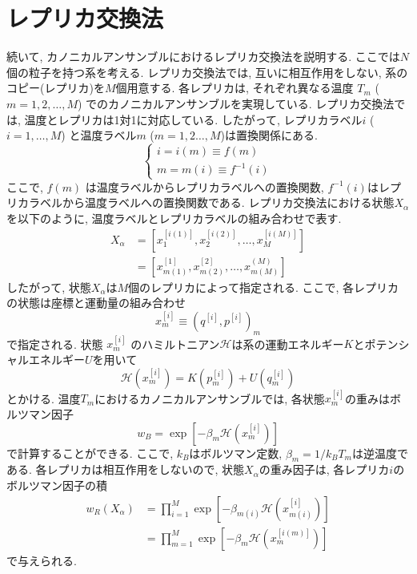 \section{\label{sec:level2-2}レプリカ交換法}
続いて, カノニカルアンサンブルにおけるレプリカ交換法\cite{Sugita1999}を説明する.
ここでは$N$個の粒子を持つ系を考える. レプリカ交換法では, 互いに相互作用をしない, 系のコピー(レプリカ)を$M$個用意する.
各レプリカは, それぞれ異なる温度 $T_m$ ($m=1,2,\dots,M$) でのカノニカルアンサンブルを実現している.
レプリカ交換法では, 温度とレプリカは1対1に対応している.
したがって, レプリカラベル$i$ ($i=1,\dots,M$) と温度ラベル$m$ ($m=1,2\dots,M$)は置換関係にある.
\begin{equation}
 \begin{cases}
   i = i(m) \equiv f(m)      \\
   m = m(i) \equiv f^{-1}(i)
 \end{cases}
\end{equation}
ここで, $f(m)$ は温度ラベルからレプリカラベルへの置換関数,  $f^{-1}(i)$はレプリカラベルから温度ラベルへの置換関数である.
レプリカ交換法における状態$X_{\alpha}$を以下のように, 温度ラベルとレプリカラベルの組み合わせで表す.
\begin{align}
 X_{\alpha} &= \left[x_{1}^{[i(1)]},x_{2}^{[i(2)]},\dots,x_{M}^{[i(M)]}\right] \\
            &= \left[x_{m(1)}^{[1]},x_{m(2)}^{[2]},\dots,x_{m(M)}^{(M)}\right]
\end{align}
したがって, 状態${X_{\alpha}}$は$M$個のレプリカによって指定される.
ここで, 各レプリカの状態は座標と運動量の組み合わせ
\begin{equation}
 x_{m}^{[i]} \equiv (q^{[i]},p^{[i]})_{m}
\end{equation}
で指定される.
状態 $x_{m}^{[i]}$ のハミルトニアン$\mathcal{H}$は系の運動エネルギー$K$とポテンシャルエネルギー$U$を用いて
\begin{equation}
 \mathcal{H}(x_{m}^{[i]}) = K(p_{m}^{[i]}) + U(q_{m}^{[i]})
\end{equation}
とかける.
温度$T_{m}$におけるカノニカルアンサンブルでは, 各状態$x_{m}^{[i]}$の重みはボルツマン因子
\begin{equation}
 w_{B} = \exp[-\beta_{m} \mathcal{H}(x_m^{[i]})]
\end{equation}
で計算することができる.
ここで, $k_{B}$はボルツマン定数, $\beta_{m} = 1/k_{B}T_{m}$は逆温度である.
各レプリカは相互作用をしないので, 状態$X_{\alpha}$の重み因子は, 各レプリカ$i$のボルツマン因子の積
\begin{align}
 w_{R}(X_{\alpha}) &= \prod_{i=1}^{M} \exp [-\beta_{m(i)} \mathcal{H}(x_{m(i)}^{[i]})] \\
                   &= \prod_{m=1}^{M} \exp [-\beta_{m} \mathcal{H}(x_m^{[i(m)]})]
 \label{eqn:weightREMH}
\end{align}
で与えられる.

